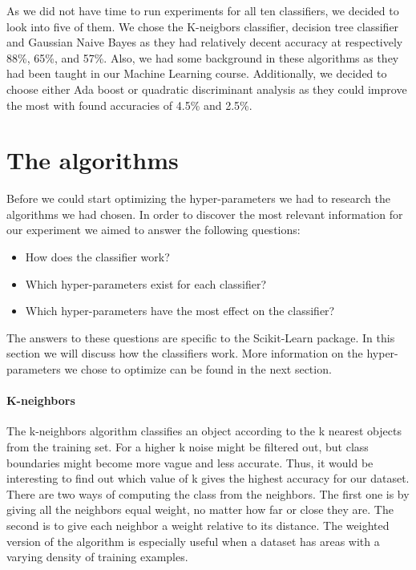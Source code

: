 \documentclass{article}
\begin{document}
	As we did not have time to run experiments for all ten classifiers, we decided to look into five of them. We chose the K-neigbors classifier, decision tree classifier and Gaussian Naive Bayes as they had relatively decent accuracy at respectively 88\%, 65\%, and 57\%. Also, we had some background in these algorithms as they had been taught in our Machine Learning course. Additionally, we decided to choose either Ada boost or quadratic discriminant analysis as they could improve the most with found accuracies of 4.5\% and 2.5\%. 

\newpage
\section{The algorithms}
	Before we could start optimizing the hyper-parameters we had to research the algorithms we had chosen. In order to discover the most relevant information for our experiment we aimed to answer the following questions:
	
	\begin{itemize}
		\item How does the classifier work? 
		\item Which hyper-parameters exist for each classifier?
		\item Which hyper-parameters have the most effect on the classifier?
	\end{itemize}
	
	The answers to these questions are specific to the Scikit-Learn package. In this section we will discuss how the classifiers work. More information on the hyper-parameters we chose to optimize can be found in the next section.
	
	\paragraph{K-neighbors}
		The k-neighbors algorithm classifies an object according to the k nearest objects from the training set. For a higher k noise might be filtered out, but class boundaries might become more vague and less accurate. Thus, it would be interesting to find out which value of k gives the highest accuracy for our dataset. There are two ways of computing the class from the neighbors. The first one is by giving all the neighbors equal weight, no matter how far or close they are.  The second is to give each neighbor a weight relative to its distance. The weighted version of the algorithm is especially useful when a dataset has areas with a varying density of training examples. 
	
\end{document}
